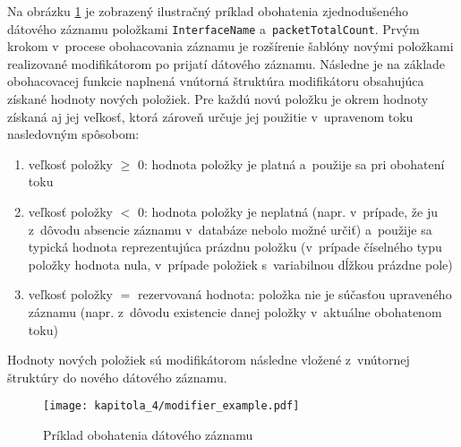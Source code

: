 Na obrázku \ref{fig:modifier_example} je zobrazený ilustračný príklad obohatenia zjednodušeného dátového záznamu položkami \texttt{InterfaceName} a~\texttt{packetTotalCount}. Prvým krokom v~procese obohacovania záznamu je rozšírenie šablóny
novými položkami realizované modifikátorom po prijatí dátového záznamu. Následne je na základe obohacovacej funkcie naplnená vnútorná štruktúra modifikátoru obsahujúca získané hodnoty nových položiek.
Pre každú novú položku je okrem hodnoty získaná aj jej veľkosť, ktorá zároveň určuje jej použitie v~upravenom toku nasledovným spôsobom: \newpage

\begin{enumerate}
    \item veľkosť položky $\geq$ 0: hodnota položky je platná a~použije sa pri obohatení toku
    \item veľkosť položky $<$ 0: hodnota položky je neplatná (napr. v~prípade, že ju z~dôvodu absencie záznamu v~databáze nebolo možné určiť) a~použije sa typická hodnota reprezentujúca prázdnu položku
        (v~prípade číselného typu položky hodnota nula, v~prípade položiek s~variabilnou dĺžkou prázdne pole)
    \item veľkosť položky $=$ rezervovaná hodnota: položka nie je súčasťou upraveného záznamu (napr. z~dôvodu existencie danej položky v~aktuálne obohatenom toku)
\end{enumerate}

Hodnoty nových položiek sú modifikátorom následne vložené z~vnútornej štruktúry do nového dátového záznamu.

\begin{figure}[ht]
    \centering
    \texttt{[image: kapitola\_4/modifier\_example.pdf]}
    \caption{Príklad obohatenia dátového záznamu}
    \label{fig:modifier_example}
\end{figure}

